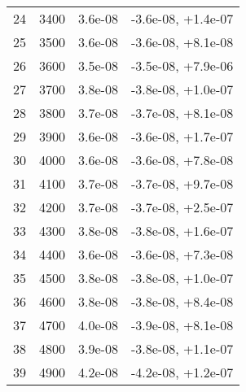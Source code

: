 \begin{table}
\begin{adjustbox}{width=1\textwidth/2}
\begin{tabular}{|c|c|c|c|}
\cline{1-4}
24 & 3400 & 3.6e-08 & -3.6e-08, +1.4e-07 \\
\cline{1-4}
25 & 3500 & 3.6e-08 & -3.6e-08, +8.1e-08 \\
\cline{1-4}
26 & 3600 & 3.5e-08 & -3.5e-08, +7.9e-06 \\
\cline{1-4}
27 & 3700 & 3.8e-08 & -3.8e-08, +1.0e-07 \\
\cline{1-4}
28 & 3800 & 3.7e-08 & -3.7e-08, +8.1e-08 \\
\cline{1-4}
29 & 3900 & 3.6e-08 & -3.6e-08, +1.7e-07 \\
\cline{1-4}
30 & 4000 & 3.6e-08 & -3.6e-08, +7.8e-08 \\
\cline{1-4}
31 & 4100 & 3.7e-08 & -3.7e-08, +9.7e-08 \\
\cline{1-4}
32 & 4200 & 3.7e-08 & -3.7e-08, +2.5e-07 \\
\cline{1-4}
33 & 4300 & 3.8e-08 & -3.8e-08, +1.6e-07 \\
\cline{1-4}
34 & 4400 & 3.6e-08 & -3.6e-08, +7.3e-08 \\
\cline{1-4}
35 & 4500 & 3.8e-08 & -3.8e-08, +1.0e-07 \\
\cline{1-4}
36 & 4600 & 3.8e-08 & -3.8e-08, +8.4e-08 \\
\cline{1-4}
37 & 4700 & 4.0e-08 & -3.9e-08, +8.1e-08 \\
\cline{1-4}
38 & 4800 & 3.9e-08 & -3.8e-08, +1.1e-07 \\
\cline{1-4}
39 & 4900 & 4.2e-08 & -4.2e-08, +1.2e-07 \\
\cline{1-4}
\end{tabular}
\end{adjustbox}
\end{table}

